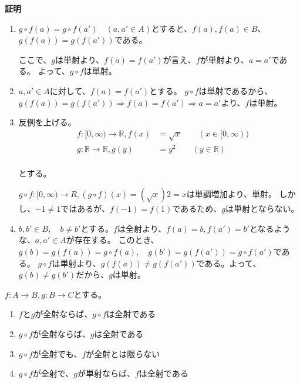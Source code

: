 \documentclass[dvipdfmx,autodetect-engine]{jsarticle}
\begin{document}
{\bf 証明}

\begin{enumerate}
\renewcommand{\labelenumi}{(\arabic{enumi})}
	\item $g \circ f(a) = g \circ f(a') \quad (a, a' \in A)$とすると、$f(a), f(a) \in B$、$g(f(a)) = g(f(a'))$である。
	
	ここで、$g$は単射より、$f(a) = f(a')$が言え、$f$が単射より、$a = a'$である。
	よって、$g \circ f$は単射。
	
	\item $a,a' \in A$に対して、$f(a) = f(a')$とする。
	$g \circ f$は単射であるから、$g(f(a)) = g(f(a')) \Rightarrow f(a) = f(a') \Rightarrow a = a'$より、$f$は単射。

    \item 反例を上げる。
    \begin{eqnarray*}
    &f:[0,∞) \to \mathbb{R}, f(x) &= \sqrt{x} \quad \quad (x \in [0,∞)) \\
    &g:\mathbb{R} \to \mathbb{R}, g(y) &= y^2  \quad \quad (y \in \mathbb{R}) \\
    \end{eqnarray*}
    
    とする。
    
    $g \circ f : [0,∞) \to R, (g \circ f)(x) = (\sqrt{x})2= x$は単調増加より、単射。
    しかし、$-1 \neq 1$ではあるが、$f(-1) = f(1)$であるため、$g$は単射とならない。
    
    
    \item $b, b' \in B, \quad b \neq b'$とする。$f$は全射より、$f(a) = b, f(a') = b'$となるような、$a, a' \in A$が存在する。
    このとき、$g(b) = g(f(a)) = g \circ f(a), \quad g(b') = g(f(a')) = g \circ f(a')$である。
    $g \circ f$は単射より、$g(f(a)) \neq g(f(a'))$である。よって、$g(b) \neq g(b')$だから、$g$は単射。
	
\end{enumerate}

 
 $f:A \to B, g: B \to C$とする。

\begin{enumerate}
\renewcommand{\labelenumi}{(\arabic{enumi})}
	\item $f$と$g$が全射ならば、$g \circ f$は全射である
	\item $g \circ f$が全射ならば、$g$は全射である
	\item $g \circ f$が全射でも、$f$が全射とは限らない
	\item $g \circ f$が全射で、$g$が単射ならば、$f$は全射である
\end{enumerate}
\end{document}
